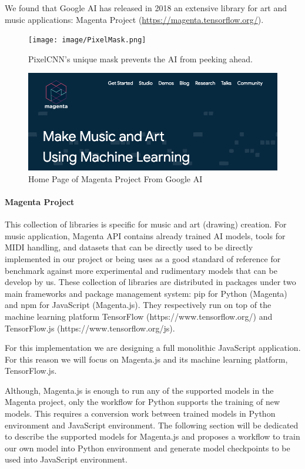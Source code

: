 We found that Google AI has released in 2018 an extensive library for art and music
applications: Magenta Project (\url{https://magenta.tensorflow.org/}).

\begin{figure}[h!]
  \centering
  \texttt{[image: image/PixelMask.png]}
  \caption{PixelCNN's unique mask prevents the AI from peeking ahead.}
  \label{fig:pixel_mask}
\end{figure}

\begin{figure}[h!]
  \centering
  \caption{Home Page of Magenta Project From Google AI}
  \includegraphics[width=\linewidth]{image/fig_JDF01.png}
\end{figure}

\paragraph{Magenta Project}

This collection of libraries is specific for music and art (drawing) creation.
For music application, Magenta API contains already trained AI models, tools for MIDI
handling, and datasets that can be directly used to be directly implemented in our
project or being uses as a good standard of reference for benchmark against more
experimental and rudimentary models that can be develop by us.
These collection of libraries are distributed in packages under two main frameworks
and package management system: pip for Python (Magenta) and npm for JavaScript
(Magenta.js). They respectively run on top of the machine learning platform TensorFlow
(https://www.tensorflow.org/) and TensorFlow.js (https://www.tensorflow.org/js).

For this implementation we are designing a full monolithic JavaScript application. For
this reason we will focus on Magenta.js and its machine learning platform,
TensorFlow.js.

Although, Magenta.js is enough to run any of the supported models in the Magenta
project, only the workflow for Python supports the training of new models. This
requires a conversion work between trained models in Python environment and
JavaScript environment. The following section will be dedicated to describe the
supported models for Magenta.js and proposes a workflow to train our own model into
Python environment and generate model checkpoints to be used into JavaScript
environment.

